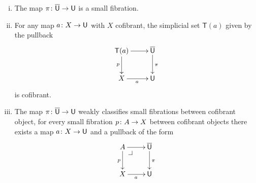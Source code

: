\documentclass[reqno,10pt,a4paper,oneside,draft]{amsart}
\begin{document}
\begin{proposition} \label{thm:universe-u}  \hfill 
\begin{enumerate}[(i)] 
\item The map $\pi \colon \overline{\mathsf{U}} \to \mathsf{U}$ is a small fibration.
\item For any map $a \colon X \rightarrow \mathsf{U}$ with $X$ cofibrant, the 
simplicial set $\mathsf{T}(a)$ given by the pullback
\[
\xymatrix{
\mathsf{T}(a) \ar[r] \ar[d]_p & \UU \ar[d]^\pi \\
X \ar[r]_a & \U }
\]
is cofibrant.
\item The map $\pi \colon \overline{\mathsf{U}} \to \mathsf{U}$ weakly classifies small fibrations between cofibrant object, \ie 
for every small fibration $p \colon A \to X$ between cofibrant objects there exists a map 
$a \colon X \to \mathsf{U}$ and a pullback  of the form
\[
\xymatrix{
A \ar[r] \ar[d]_p \drpullback & \UU \ar[d]^\pi \\
X \ar[r]_{a} & \U }
\]
\end{enumerate}
\end{proposition}
\end{document}
